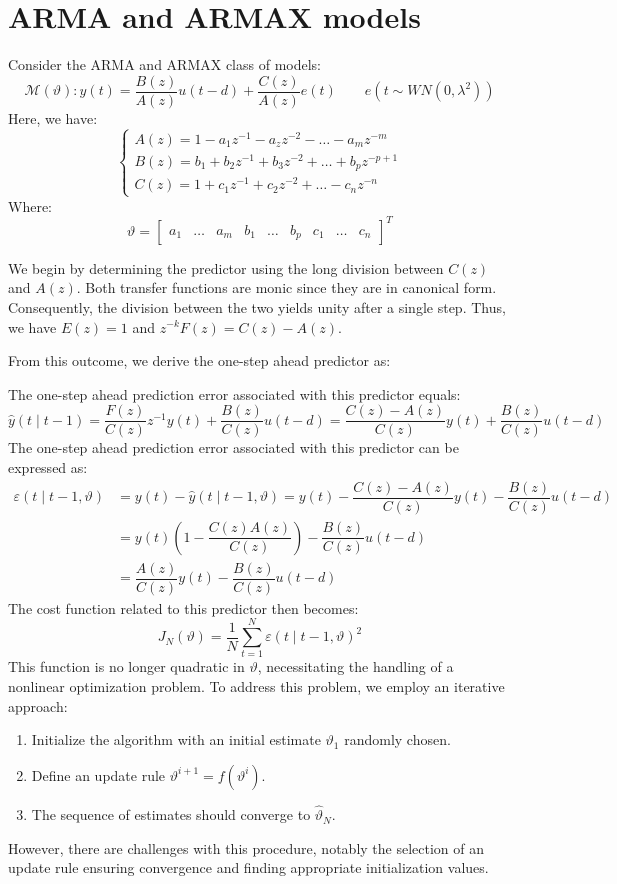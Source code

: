 \section{ARMA and ARMAX models}

Consider the ARMA and ARMAX class of models:
\[\mathcal{M}(\vartheta): y(t)=\dfrac{B(z)}{A(z)}u(t-d)+\dfrac{C(z)}{A(z)}e(t)\qquad e(t \sim WN(0,\lambda^2))\]
Here, we have:
\[\begin{cases}
    A(z)=1-a_1z^{-1}-a_zz^{-2}-\dots-a_mz^{-m} \\
    B(z)=b_1+b_2z^{-1}+b_3z^{-2}+\dots+b_pz^{-p+1} \\
    C(z)=1+c_1z^{-1}+c_2z^{-2}+\dots-c_nz^{-n}
\end{cases}\]
Where: 
\[\vartheta=\begin{bmatrix}
    a_1 & \dots & a_m & b_1 & \dots & b_p & c_1 & \dots & c_n
\end{bmatrix}^T\]

We begin by determining the predictor using the long division between $C(z)$ and $A(z)$. 
Both transfer functions are monic since they are in canonical form. 
Consequently, the division between the two yields unity after a single step. 
Thus, we have $E(z)=1$ and $z^{-k}F(z)=C(z)-A(z)$.

From this outcome, we derive the one-step ahead predictor as:

The one-step ahead prediction error associated with this predictor equals:
\[\hat{y}(t\mid t-1)=\dfrac{F(z)}{C(z)}z^{-1}y(t)+\dfrac{B(z)}{C(z)}u(t-d)=\dfrac{C(z)-A(z)}{C(z)}y(t)+\dfrac{B(z)}{C(z)}u(t-d)\]
The one-step ahead prediction error associated with this predictor can be expressed as:
\begin{align*}
    \varepsilon(t\mid t-1,\vartheta)&=y(t)-\hat{y}(t\mid t-1,\vartheta)=y(t)-\dfrac{C(z)-A(z)}{C(z)}y(t)-\dfrac{B(z)}{C(z)}u(t-d)\\
                                &=y(t)\left(1-\dfrac{C(z)A(z)}{C(z)}\right) - \dfrac{B(z)}{C(z)}u(t-d) \\
                                &=\dfrac{A(z)}{C(z)}y(t)-\dfrac{B(z)}{C(z)}u(t-d)
\end{align*}
The cost function related to this predictor then becomes:
\[J_N(\vartheta)=\dfrac{1}{N}\sum_{t=1}^N \varepsilon(t\mid t-1,\vartheta)^2\]
This function is no longer quadratic in $\vartheta$, necessitating the handling of a nonlinear optimization problem.
To address this problem, we employ an iterative approach:
\begin{enumerate}
    \item Initialize the algorithm with an initial estimate $\vartheta_1$ randomly chosen.
    \item Define an update rule $\vartheta^{i+1}=f\left(\vartheta^{i}\right)$.
    \item The sequence of estimates should converge to $\hat{\vartheta}_N$.
\end{enumerate}
However, there are challenges with this procedure, notably the selection of an update rule ensuring convergence and finding appropriate initialization values.


